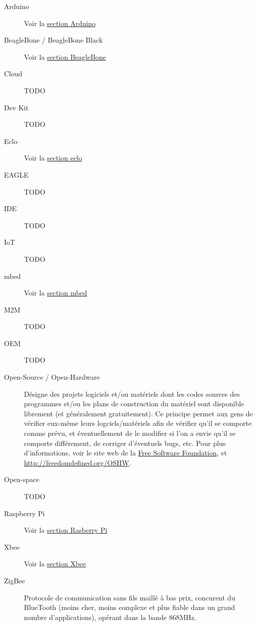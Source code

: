 \documentclass{article}
\begin{document}
\begin{description}
    \item[Arduino] Voir la \hyperref[arduino]{section Arduino}
    \item[BeagleBone / BeagleBone Black] Voir la \hyperref[bbb]{section BeagleBone}
    \item[Cloud] TODO
    \item[Dev Kit] TODO
    \item[Eclo] Voir la \hyperref[eclo]{section eclo}
    \item[EAGLE] TODO
    \item[IDE] TODO
    \item[IoT] TODO
    \item[mbed] Voir la \hyperref[mbed]{section mbed}
    \item[M2M] TODO
    \item[OEM] TODO
    \item[Open-Source / Open-Hardware] Désigne des projets logiciels et/ou matériels dont les codes sources des programmes et/ou les plans de construction du matériel sont disponible librement (et généralement gratuitement). Ce principe permet aux gens de vérifier eux-même leurs logciels/matériels afin de vérifier qu’il se comporte comme prévu, et éventuellement de le modifier si l’on a envie qu’il se comporte différement, de corriger d’éventuels bugs, etc. Pour plus d’informations, voir le site web de la \hyperref[https://www.fsf.org/]{Free Software Foundation}, et \hyperref[freedom defined]{http://freedomdefined.org/OSHW}.
    \item[Open-space] TODO
    \item[Raspberry Pi] Voir la \hyperref[rpi]{section Rasberry Pi}
    \item[Xbee] Voir la \hyperref[xbee]{section Xbee}
    \item[ZigBee] Protocole de communication sans fils maillé à bas prix, concurent du BlueTooth (moins cher, moins complexe et plus fiable dans un grand nombre d’applications), opérant dans la bande 868MHz.
\end{description}

\clearpage
\end{document}
